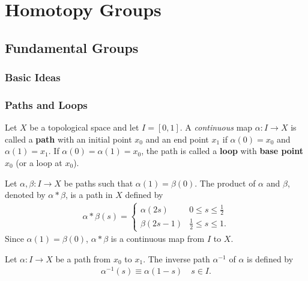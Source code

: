 \documentclass[10pt]{article}
\begin{document}
\clearpage
\section{Homotopy Groups}
\subsection{Fundamental Groups}
\subsubsection{Basic Ideas}
\subsubsection{Paths and Loops}
\begin{definition}[Path]
    Let $X$ be a topological space and let $I=[0,1]$.
    A \textit{continuous} map $\alpha:I\to X$ is called a \textbf{path} with an initial point $x_0$ and an end point $x_1$ if $\alpha(0)=x_0$ and $\alpha(1)=x_1$.
    If $\alpha(0)=\alpha(1)=x_0$, the path is called a \textbf{loop} with \textbf{base point} $x_0$ (or a loop at $x_0$).
\end{definition}

\begin{definition}
    Let $\alpha,\beta: I\to X$ be paths such that $\alpha(1)=\beta(0)$.
    The product of $\alpha$ and $\beta$, denoted by $\alpha*\beta$, is a path in $X$ defined by
    \begin{align}
        \alpha*\beta(s)=\begin{cases}
            \alpha(2s)  & 0\leq s\leq\frac{1}{2}  \\
            \beta(2s-1) & \frac{1}{2}\leq s\leq1.
        \end{cases}
    \end{align}
    Since $\alpha(1)=\beta(0)$, $\alpha*\beta$ is a continuous map from $I$ to $X$.
\end{definition}
\begin{definition}
    Let $\alpha:I\to X$ be a path from $x_0$ to $x_1$.
    The inverse path $\alpha^{-1}$ of $\alpha$ is defined by
    \begin{align}
        \alpha^{-1}(s)\equiv\alpha(1-s)\quad s\in I.
    \end{align}
\end{definition}
\end{document}
